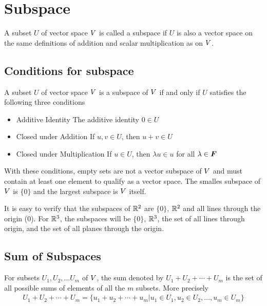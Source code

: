 \documentclass[../../linear_algebra.tex]{subfiles}
\begin{document}
\section{Subspace}
A subset $U$ of vector space $V$ is called a subspace if $U$ is also a vector space on the same definitions of addition and scalar multiplication as on $V$.\newline

\subsection{Conditions for subspace}
A subset $U$ of vector space $V$ is a subspace of $V$ if and only if $U$ satisfies the following three conditions
\begin{itemize}
    \item Additive Identity\newline
    The additive identity $0 \in U$
    \item Closed under Addition\newline
    If $u,v \in U$, then $u + v \in U$
    \item Closed under Multiplication\newline
    If $u \in U$, then $\lambda u \in u$ for all $\lambda \in \bm{F}$
\end{itemize}

With these conditions, empty sets are not a vector subspace of $V$ and must contain at least one element to qualify as a vector space. The smalles subspace of $V$ is $\{ 0 \}$ and the largest subspace is $V$ itself.\newline

It is easy to verify that the subspaces of $\mathbb{R}^{2}$ are $\{ 0\}$, $\mathbb{R}^{2}$ and all lines through the origin ($0$). For $\mathbb{R}^{3}$, the subspaces will be $\{ 0\}$, $\mathbb{R}^{3}$, the set of all lines through origin, and the set of all planes through the origin.

\subsection{Sum of Subspaces}
For subsets $U_{1}, U_{2}, \ldots U_{m}$ of $V$, the sum denoted by $U_{1} + U_{2} + \cdots + U_{m}$ is the set of all possible sums of elements of all the $m$ subsets. More precisely
\begin{align*}
    U_{1} + U_{2} + \cdots + U_{m} = \{u_{1} + u_{2} + \cdots + u_{m} | u_{1} \in U_{1}, u_{2} \in U_{2}, \ldots, u_{m} \in U_{m} \}
\end{align*}
\end{document}
